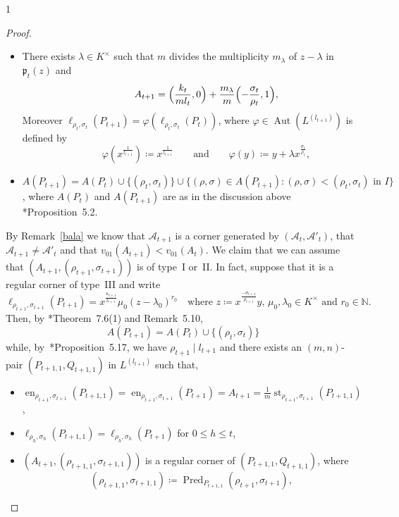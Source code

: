 \documentclass[reqno,a4paper,twoside]{amsart}
\theoremstyle{definition}
\theoremstyle{remark}
\DeclareMathOperator{\Aut}{Aut}
\DeclareMathOperator{\en}{en}
\DeclareMathOperator{\st}{st}
\DeclareMathOperator{\Pred}{Pred}
\begin{document}
\begin{spacing}{1}
\begin{proof}
\begin{itemize}[itemsep=0.5675ex,topsep=0.5675ex]
\item[-] There exists $\lambda\in K^{\times}$ such that $m$ divides the multiplicity $m_{\lambda}$ of $z-\lambda$ in $\mathfrak{p}_t(z)$ and
$$
\qquad\quad A_{t+1} = \Bigl(\frac{k_t}{m l_t},0\Bigr) + \frac{m_{\lambda}}{m} \Bigl(-\frac{\sigma_t}{\rho_t}, 1\Bigr),
$$
Moreover $\ell_{\rho_t,\sigma_t}(P_{t+1}) = \varphi(\ell_{\rho_t,\sigma_t}(P_t))$, where $\varphi\in \Aut(L^{(l_{t+1})})$ is defined by
$$
\qquad\quad \varphi(x^{\frac{1}{l_{t+1}}})\coloneqq x^{\frac{1}{l_{t+1}}}\qquad\text{and}\qquad \varphi(y)\coloneqq y+\lambda x^{\frac{\sigma_t}{\rho_t}},
$$

\item[-] $A(P_{t+1}) = A(P_t)\cup \{(\rho_t,\sigma_t)\}\cup \{(\rho,\sigma)\in A(P_{t+1}):(\rho,\sigma)<(\rho_t,\sigma_t)\text{ in } I\}$, where $A(P_t)$ and $A(P_{t+1})$ are as in the discussion above \cite{GGV1}*{Proposition~5.2}.

\end{itemize}
By Remark~\ref{bala} we know that $\mathcal{A}_{t+1}$ is a corner generated by $(\mathcal{A}_t,\mathcal{A}'_t)$, that $\mathcal{A}_{t+1}\ne \mathcal{A}'_t$ and that $v_{01}(A_{t+1})<v_{01}(A_t)$. We claim that we can assume that $(A_{t+1},(\rho_{t+1},\sigma_{t+1}))$ is of type~I or~II. In fact, suppose that it is a regular corner of type~III and write
$$
\ell_{\rho_{t+1},\sigma_{t+1}}(P_{t+1}) = x^{\frac{\kappa_{t+1}}{l_{t+1}}}\mu_0 (z-\lambda_0)^{r_0}\quad\text{where $z\coloneqq x^{\frac{-\sigma_{t+1}}{\rho_{t+1}}}y$, $\mu_0,\lambda_0\in K^{\times}$ and $r_0\in \mathds{N}$.}
$$
Then, by \cite{GGV1}*{Theorem~7.6(1) and Remark~5.10},
$$
A(P_{t+1}) = A(P_t)\cup \{(\rho_t,\sigma_t)\}
$$
while, by~\cite{GGV1}*{Proposition~5.17}, we have $\rho_{t+1}\mid l_{t+1}$ and there exists an $(m,n)$-pair $(P_{t+1,1},Q_{t+1,1})$ in $L^{(l_{t+1})}$ such that,

\begin{itemize}[itemsep=0.5675ex,topsep=0.5675ex]

\item[-] $\en_{\rho_{t+1},\sigma_{t+1}}(P_{t+1,1}) = \en_{\rho_{t+1},\sigma_{t+1}}(P_{t+1}) = A_{t+1} = \frac{1}{m}\st_{\rho_{t+1},\sigma_{t+1}}(P_{t+1,1})$,

\item[-]  $\ell_{\rho_h,\sigma_h}(P_{t+1,1}) = \ell_{\rho_h,\sigma_h}(P_{t+1})$ for $0\le h\le t$,

\item[-] $(A_{t+1},(\rho_{t+1,1},\sigma_{t+1,1}))$ is a regular corner of $(P_{t+1,1},Q_{t+1,1})$, where
$$
(\rho_{t+1,1},\sigma_{t+1,1})\coloneqq \Pred_{P_{t+1,1}} (\rho_{t+1},\sigma_{t+1}),
$$


\end{itemize}
\end{proof}
\end{spacing}
\end{document}
